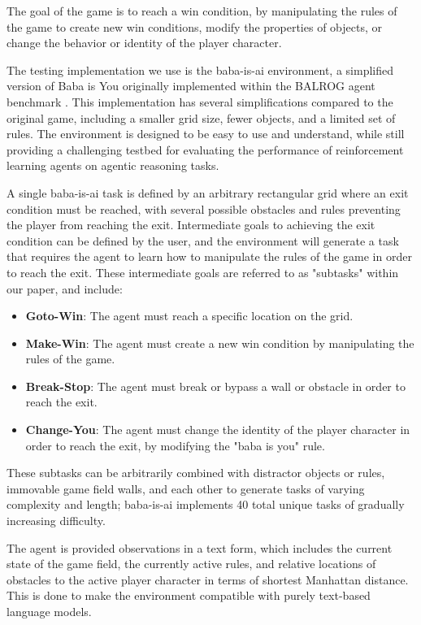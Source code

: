 The goal of the game is to reach a win condition, by manipulating the rules of
the game to create new win conditions, modify the properties of objects, or
change the behavior or identity of the player character.

The testing implementation we use is the baba-is-ai environment, a simplified version
of Baba is You originally implemented within the BALROG agent benchmark \cite{cloos2024babaaibreakrules,
paglieri2024balrog}. This implementation has several simplifications compared to
the original game, including a smaller grid size, fewer objects, and a limited set
of rules. The environment is designed to be easy to use and understand, while still
providing a challenging testbed for evaluating the performance of reinforcement learning
agents on agentic reasoning tasks.

A single baba-is-ai task is defined by an arbitrary rectangular grid where an exit
condition must be reached, with several possible obstacles and rules preventing
the player from reaching the exit. Intermediate goals to achieving the exit condition
can be defined by the user, and the environment will generate a task that
requires the agent to learn how to manipulate the rules of the game in order to
reach the exit. These intermediate goals are referred to as "subtasks" within our
paper, and include:

\begin{itemize}
	\item \textbf{Goto-Win}: The agent must reach a specific location on the grid.

	\item \textbf{Make-Win}: The agent must create a new win condition by manipulating
		the rules of the game.

	\item \textbf{Break-Stop}: The agent must break or bypass a wall or obstacle in
		order to reach the exit.

	\item \textbf{Change-You}: The agent must change the identity of the player character
		in order to reach the exit, by modifying the "baba is you" rule.
\end{itemize}

These subtasks can be arbitrarily combined with distractor objects or rules,
immovable game field walls, and each other to generate tasks of varying complexity
and length; baba-is-ai implements 40 total unique tasks of gradually increasing
difficulty.

The agent is provided observations in a text form, which includes the current state
of the game field, the currently active rules, and relative locations of obstacles
to the active player character in terms of shortest Manhattan distance. This is
done to make the environment compatible with purely text-based language models.

